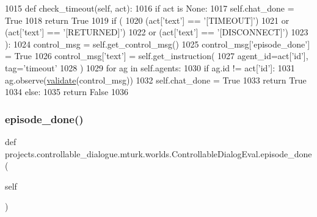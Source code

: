 \begin{DoxyCode}
1015     \textcolor{keyword}{def }check\_timeout(self, act):
1016         \textcolor{keywordflow}{if} act \textcolor{keywordflow}{is} \textcolor{keywordtype}{None}:
1017             self.chat\_done = \textcolor{keyword}{True}
1018             \textcolor{keywordflow}{return} \textcolor{keyword}{True}
1019         \textcolor{keywordflow}{if} (
1020             (act[\textcolor{stringliteral}{'text'}] == \textcolor{stringliteral}{'[TIMEOUT]'})
1021             \textcolor{keywordflow}{or} (act[\textcolor{stringliteral}{'text'}] == \textcolor{stringliteral}{'[RETURNED]'})
1022             \textcolor{keywordflow}{or} (act[\textcolor{stringliteral}{'text'}] == \textcolor{stringliteral}{'[DISCONNECT]'})
1023         ):
1024             control\_msg = self.get\_control\_msg()
1025             control\_msg[\textcolor{stringliteral}{'episode\_done'}] = \textcolor{keyword}{True}
1026             control\_msg[\textcolor{stringliteral}{'text'}] = self.get\_instruction(
1027                 agent\_id=act[\textcolor{stringliteral}{'id'}], tag=\textcolor{stringliteral}{'timeout'}
1028             )
1029             \textcolor{keywordflow}{for} ag \textcolor{keywordflow}{in} self.agents:
1030                 \textcolor{keywordflow}{if} ag.id != act[\textcolor{stringliteral}{'id'}]:
1031                     ag.observe(\hyperlink{namespaceparlai_1_1core_1_1worlds_afc3fad603b7bce41dbdc9cdc04a9c794}{validate}(control\_msg))
1032             self.chat\_done = \textcolor{keyword}{True}
1033             \textcolor{keywordflow}{return} \textcolor{keyword}{True}
1034         \textcolor{keywordflow}{else}:
1035             \textcolor{keywordflow}{return} \textcolor{keyword}{False}
1036 
\end{DoxyCode}
\mbox{\label{classprojects_1_1controllable__dialogue_1_1mturk_1_1worlds_1_1ControllableDialogEval_a491b1a63d694486f7414da91e82d5c7d}} 
\subsubsection{\texorpdfstring{episode\+\_\+done()}{episode\_done()}}
{\footnotesize\ttfamily def projects.\+controllable\+\_\+dialogue.\+mturk.\+worlds.\+Controllable\+Dialog\+Eval.\+episode\+\_\+done (\begin{DoxyParamCaption}\item[{}]{self }\end{DoxyParamCaption})}



